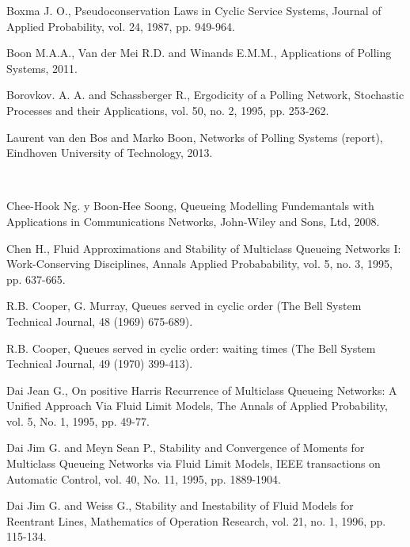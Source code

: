 \begin{thebibliography}{99}
 Boxma J. O., Pseudoconservation Laws in Cyclic
Service Systems, Journal of Applied Probability, vol. 24, 1987,
pp. 949-964.

 Boon M.A.A., Van der Mei R.D.  and
Winands E.M.M., Applications of Polling Systems, 2011.

 Borovkov. A. A. and Schassberger R., Ergodicity
of a Polling Network, Stochastic Processes and their Applications,
vol. 50, no. 2, 1995, pp. 253-262.


Laurent van den Bos and Marko Boon, Networks of Polling Systems (report), Eindhoven University of Technology, 2013.

\


 Chee-Hook Ng. y Boon-Hee Soong, Queueing
Modelling Fundemantals with Applications in Communications
Networks, John-Wiley and Sons, Ltd, 2008.

 Chen H., Fluid Approximations and Stability of
Multiclass Queueing Networks I: Work-Conserving Disciplines,
Annals Applied Probabability, vol. 5, no. 3, 1995, pp. 637-665.

 R.B. Cooper, G. Murray, Queues served in cyclic order (The Bell
System Technical Journal, 48 (1969) 675-689).

 R.B. Cooper, Queues served in cyclic order: waiting times (The
Bell System Technical Journal, 49 (1970) 399-413).

 Dai Jean G., On positive Harris Recurrence of Multiclass Queueing
Networks: A Unified Approach Via Fluid Limit Models, The Annals of
Applied Probability, vol. 5, No. 1, 1995, pp. 49-77.

 Dai Jim G. and Meyn Sean P., Stability and Convergence of Moments
for Multiclass Queueing Networks via Fluid Limit Models, IEEE
transactions on Automatic Control, vol. 40, No. 11, 1995, pp.
1889-1904.

Dai Jim G.  and Weiss G., Stability and Inestability of Fluid
Models for Reentrant Lines, Mathematics of Operation Research,
vol. 21, no. 1, 1996, pp. 115-134.


\end{thebibliography}
